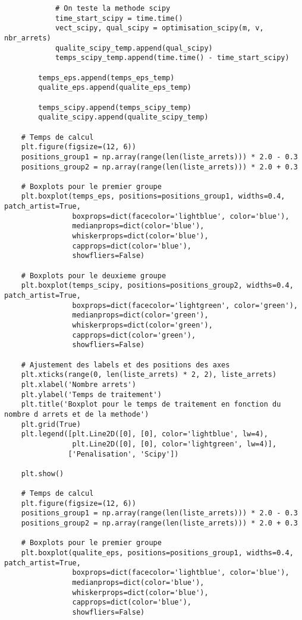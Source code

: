 \documentclass[12pt]{article}
\begin{document}
\begin{lstlisting}
            # On teste la methode scipy
            time_start_scipy = time.time()
            vect_scipy, qual_scipy = optimisation_scipy(m, v, nbr_arrets)
            qualite_scipy_temp.append(qual_scipy)
            temps_scipy_temp.append(time.time() - time_start_scipy)

        temps_eps.append(temps_eps_temp)
        qualite_eps.append(qualite_eps_temp)

        temps_scipy.append(temps_scipy_temp)
        qualite_scipy.append(qualite_scipy_temp)

    # Temps de calcul
    plt.figure(figsize=(12, 6))
    positions_group1 = np.array(range(len(liste_arrets))) * 2.0 - 0.3
    positions_group2 = np.array(range(len(liste_arrets))) * 2.0 + 0.3

    # Boxplots pour le premier groupe
    plt.boxplot(temps_eps, positions=positions_group1, widths=0.4, patch_artist=True,
                boxprops=dict(facecolor='lightblue', color='blue'),
                medianprops=dict(color='blue'),
                whiskerprops=dict(color='blue'),
                capprops=dict(color='blue'),
                showfliers=False)

    # Boxplots pour le deuxieme groupe
    plt.boxplot(temps_scipy, positions=positions_group2, widths=0.4, patch_artist=True,
                boxprops=dict(facecolor='lightgreen', color='green'),
                medianprops=dict(color='green'),
                whiskerprops=dict(color='green'),
                capprops=dict(color='green'),
                showfliers=False)

    # Ajustement des labels et des positions des axes
    plt.xticks(range(0, len(liste_arrets) * 2, 2), liste_arrets)
    plt.xlabel('Nombre arrets')
    plt.ylabel('Temps de traitement')
    plt.title('Boxplot pour le temps de traitement en fonction du nombre d arrets et de la methode')
    plt.grid(True)
    plt.legend([plt.Line2D([0], [0], color='lightblue', lw=4),
                plt.Line2D([0], [0], color='lightgreen', lw=4)],
               ['Penalisation', 'Scipy'])

    plt.show()

    # Temps de calcul
    plt.figure(figsize=(12, 6))
    positions_group1 = np.array(range(len(liste_arrets))) * 2.0 - 0.3
    positions_group2 = np.array(range(len(liste_arrets))) * 2.0 + 0.3

    # Boxplots pour le premier groupe
    plt.boxplot(qualite_eps, positions=positions_group1, widths=0.4, patch_artist=True,
                boxprops=dict(facecolor='lightblue', color='blue'),
                medianprops=dict(color='blue'),
                whiskerprops=dict(color='blue'),
                capprops=dict(color='blue'),
                showfliers=False)


\end{lstlisting}
\end{document}
